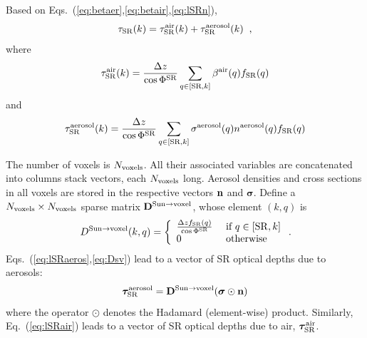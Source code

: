 \documentclass[10pt,twocolumn,letterpaper]{article}
\newcommand{\vect}[1]{\bm{#1}}
\begin{document}
Based on Eqs.~(\ref{eq:betaer},\ref{eq:betair},\ref{eq:lSRn}),
\begin{equation}
  \tau_{\rm SR}(k)=
   \tau_{\rm SR}^{\rm air}(k) +  \tau_{\rm SR}^{\rm aerosol}(k)
  \;\;,
  \label{eq:lSRaa}
\end{equation}
where
\begin{equation}
  \tau_{\rm SR}^{\rm air}(k)=\frac{\Delta z}{\cos\Phi^{\rm SR}}
     \sum_{q \in[{\rm SR},k]}
     \beta^{\rm air}(q)  f_{\rm SR}(q)
  \label{eq:lSRair}
\end{equation}
and
\begin{equation}
  \tau_{\rm SR}^{\rm aerosol}(k)=\frac{\Delta z}{\cos\Phi^{\rm SR}}
     \sum_{q \in[{\rm SR},k]}
     \sigma^{\rm aerosol}(q) n^{\rm aerosol}(q) f_{\rm SR}(q)
  \label{eq:lSRaeros}
\end{equation}

The number of voxels is  $N_{\rm voxels}$. All their associated
variables are concatenated into columns stack vectors, each $N_{\rm voxels}$ long. Aerosol densities and cross sections in all voxels are stored in the respective vectors ${\bf n}$ and $\vect{\sigma}$. Define a $N_{\rm voxels}\times N_{\rm voxels}$ sparse matrix ${\bf D}^{\mathrm{Sun \rightarrow voxel}}$, whose 
element $(k,q)$ is
\begin{equation}
  D^{\mathrm{Sun \rightarrow voxel}}(k,q) =
  \left\{
      \begin{array}{ll}
          \frac{\Delta zf_{\rm SR}(q)}{\cos\Phi^{\rm SR}}
                & \mbox{ if $q \in[{\rm SR},k]$} \\
          0  & \mbox{ otherwise}
    \label{eq:Dsv}
       \end{array}
  \right.
  .
  \hspace{-0.05cm}
\end{equation}
Eqs.~(\ref{eq:lSRaeros},\ref{eq:Dsv}) lead to a vector of SR optical depths due to aerosols:
\begin{equation}
  \vect{\tau}_{\rm SR}^{\rm aerosol}=
  {\bf D}^{\mathrm{Sun \rightarrow voxel}}
     (\vect{\sigma} \odot {\bf n})
  \label{eq:tauSRvec1}
\end{equation}
where the operator $\odot$ denotes the Hadamard (element-wise)
product. 
Similarly, Eq.~(\ref{eq:lSRair}) leads to a vector of SR optical depths due to air,
$\vect{\tau}_{\rm SR}^{\rm air}$.
\end{document}

